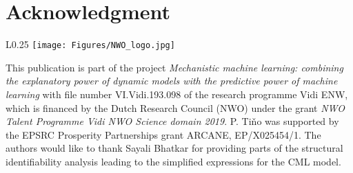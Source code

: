 \section*{Acknowledgment}
\begin{wrapfigure}[8]{L}{0.25\columnwidth}
\vspace{-0.35cm}
\texttt{[image: Figures/NWO\_logo.jpg]}
\end{wrapfigure}
\noindent This publication is part of the project \emph{Mechanistic machine learning: combining the explanatory power of dynamic models with the predictive power of machine learning} with file number VI.Vidi.193.098 of the research programme Vidi ENW, which is financed by the Dutch Research Council (NWO) under the grant \emph{NWO Talent Programme Vidi NWO Science domain 2019}. P.
Ti\v{n}o was supported by the EPSRC Prosperity Partnerships grant ARCANE, EP/X025454/1.
\noindent The authors would like to thank Sayali Bhatkar for providing parts of the structural identifiability analysis leading to the simplified expressions for the CML model.